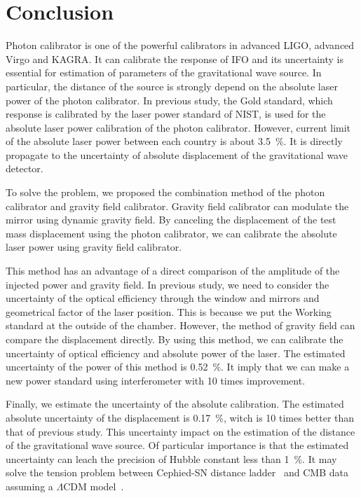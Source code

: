 \documentclass[%
 reprint,
superscriptaddress,
 amsmath,amssymb,
 aps,
]{revtex4-1}
\begin{document}
\section{Conclusion}
Photon calibrator is one of the powerful calibrators in advanced LIGO, advanced Virgo and KAGRA. It can calibrate the response of IFO and its uncertainty is essential for estimation of parameters of the gravitational wave source. In particular, the distance of the source is strongly depend on the absolute laser power of the photon calibrator. In previous study, the Gold standard, which response is calibrated by the laser power standard of NIST, is used for the absolute laser power calibration of the photon calibrator. However, current limit of the absolute laser power between each country is about 3.5~\%. It is directly propagate to the uncertainty of absolute displacement of the gravitational wave detector.

To solve the problem, we proposed the combination method of the photon calibrator and gravity field calibrator. Gravity field calibrator can modulate the mirror using dynamic gravity field. By canceling the displacement of the test mass displacement using the photon calibrator, we can calibrate the absolute laser power using gravity field calibrator.

This method has an advantage of a direct comparison of the amplitude of the injected power and gravity field. In previous study, we need to consider the uncertainty of the optical efficiency through the window and mirrors  and geometrical factor of the laser position. This is because we put the Working standard at the outside of the chamber. However, the method of gravity field can compare the displacement directly. By using this method, we can calibrate the uncertainty of optical efficiency and absolute power of the laser.  The estimated uncertainty of the power of this method is 0.52~\%. It imply that we can make a new power standard using interferometer with 10 times improvement.

Finally, we estimate the uncertainty of the absolute calibration. The estimated absolute uncertainty of the displacement is 0.17~\%, witch is 10 times better than that of previous study. This uncertainty impact on the estimation of the distance of the gravitational wave source. Of particular importance is that the estimated uncertainty can leach the precision of Hubble constant less than 1~\%. It may solve the tension problem between Cephied-SN distance ladder~\cite{Riess_2016} and CMB data assuming a $\Lambda$CDM 
model~\cite{2016-planck}.
\end{document}
